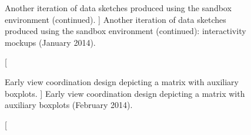 

\begin{figure}
	\centering
	\caption
	[
	    Another iteration of data sketches produced using the sandbox environment (continued).
	]
	{
    	Another iteration of data sketches produced using the sandbox environment (continued): interactivity mockups (January 2014). 
	}
	\centering
	\label{app:emu:fig:sketches-2}
\end{figure}



\begin{figure}
	\centering
	\caption
	[
	    Early view coordination design depicting a matrix with auxiliary boxplots.
	]
	{
    	Early view coordination design depicting a matrix with auxiliary boxplots (February 2014). 
	}
	\centering
	\label{app:emu:fig:boxplots}
\end{figure}

